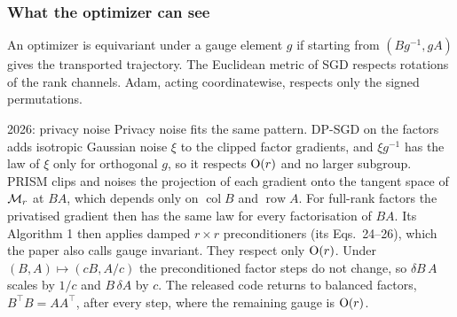 \subsubsection{What the optimizer can see}\label{sec:fibres-hierarchy}

An optimizer is equivariant under a gauge element $g$ if starting from $(Bg^{-1},gA)$ gives the transported trajectory.
The Euclidean metric of SGD respects rotations of the rank channels. Adam, acting coordinatewise, respects only the
signed permutations.

\begin{remark*}{2026: privacy noise}
Privacy noise fits the same pattern. DP-SGD \citep{xabadi2016deep} on the factors adds isotropic Gaussian noise $\xi$ to
the clipped factor gradients, and $\xi g^{-1}$ has the law of $\xi$ only for orthogonal $g$, so it respects $\mathrm{O}(r)$
and no larger subgroup. PRISM \citep{wang2026prism} clips and noises the projection of each gradient onto the tangent
space of $\mathcal{M}_r$ at $BA$, which depends only on $\operatorname{col}B$ and $\operatorname{row}A$. For full-rank factors
the privatised gradient then has the same law for every factorisation of $BA$. Its Algorithm 1 then applies damped
$r\times r$ preconditioners (its Eqs.~24--26), which the paper also calls gauge invariant. They respect only $\mathrm{O}(r)$.
Under $(B,A)\mapsto(cB,A/c)$ the preconditioned factor steps do not change, so $\delta B\,A$ scales by $1/c$ and
$B\,\delta A$ by $c$. The released code returns to balanced factors, $B^\top B=AA^\top$, after every step, where the
remaining gauge is $\mathrm{O}(r)$.
\end{remark*}

